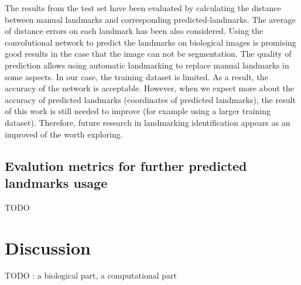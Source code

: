 \documentclass[review]{elsarticle}
\begin{document}
The results from the test set have been evaluated by calculating the distance between manual landmarks and corresponding predicted-landmarks. The average of distance errors on each landmark has been also considered. Using the convolutional network to predict the landmarks on biological images is promising good results in the case that the image can not be segmentation. The quality of prediction allows using automatic landmarking to replace manual landmarks in some aspects.  In our case, the training dataset is limited. As a result, the accuracy of the network is acceptable. However, when we expect more about the accuracy of predicted landmarks (coordinates of predicted landmarks), the result of this work is still needed to improve (for example using a larger training dataset). Therefore, future research in landmarking identification appears as an improved of the worth exploring.

\subsection{Evalution metrics for further predicted landmarks usage}

TODO \\

\section{Discussion}

TODO : a biological part, a computational part \\


\end{document}
